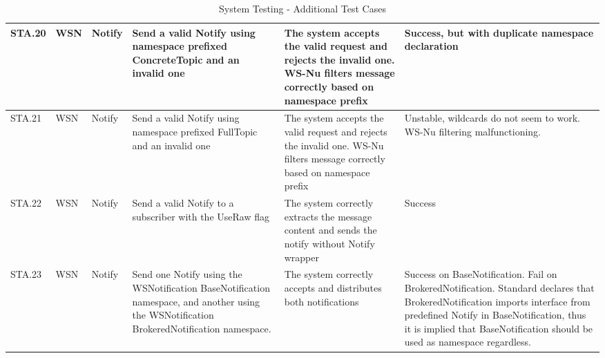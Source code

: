 \begin{table}[ht!]
\begin{tabular}{|m{0.5cm}|m{1.2cm}|m{1.2cm}|m{3.3cm}|m{3.3cm}|m{1.5cm}|}
STA.20 & WSN & Notify & Send a valid Notify using namespace prefixed ConcreteTopic and an invalid one & The system accepts the valid request and rejects the invalid one. WS-Nu filters message correctly based on namespace prefix & Success, but with duplicate namespace declaration \\ \hline
STA.21 & WSN & Notify & Send a valid Notify using namespace prefixed FullTopic and an invalid one & The system accepts the valid request and rejects the invalid one. WS-Nu filters message correctly based on namespace prefix & Unstable, wildcards do not seem to work. WS-Nu filtering malfunctioning. \\ \hline
STA.22 & WSN & Notify & Send a valid Notify to a subscriber with the UseRaw flag & The system correctly extracts the message content and sends the notify without Notify wrapper & Success \\ \hline
STA.23 & WSN & Notify & Send one Notify using the WSNotification BaseNotification namespace, and another using the WSNotification BrokeredNotification namespace. & The system correctly accepts and distributes both notifications & Success on BaseNotification. Fail on BrokeredNotification. Standard declares that BrokeredNotification imports interface from predefined Notify in BaseNotification, thus it is implied that BaseNotification should be used as namespace regardless. \\ \hline

\end{tabular}
\caption{System Testing - Additional Test Cases}
\label{table:system_testing-additional_test_cases}
\end{table}

